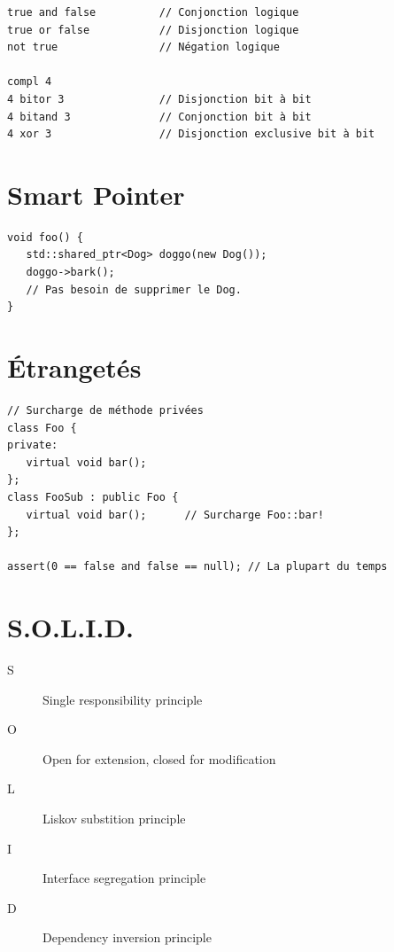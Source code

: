 \documentclass{article}
\begin{document}
\begin{multicols*}{3}
    \begin{lstlisting}
true and false          // Conjonction logique
true or false           // Disjonction logique
not true                // Négation logique

compl 4
4 bitor 3               // Disjonction bit à bit
4 bitand 3              // Conjonction bit à bit
4 xor 3                 // Disjonction exclusive bit à bit
\end{lstlisting}

    \section*{Smart Pointer}

    \begin{lstlisting}
void foo() {
   std::shared_ptr<Dog> doggo(new Dog());
   doggo->bark();
   // Pas besoin de supprimer le Dog.
}

\end{lstlisting}

    \section*{Étrangetés}

    \begin{lstlisting}
// Surcharge de méthode privées
class Foo {
private:
   virtual void bar();
};
class FooSub : public Foo {
   virtual void bar();      // Surcharge Foo::bar!
};

assert(0 == false and false == null); // La plupart du temps
\end{lstlisting}

    \section*{S.O.L.I.D.}
    \begin{description}
        \item[S] Single responsibility principle
        \item[O] Open for extension, closed for modification
        \item[L] Liskov substition principle
        \item[I] Interface segregation principle
        \item[D] Dependency inversion principle
    \end{description}

\end{multicols*}
\end{document}
